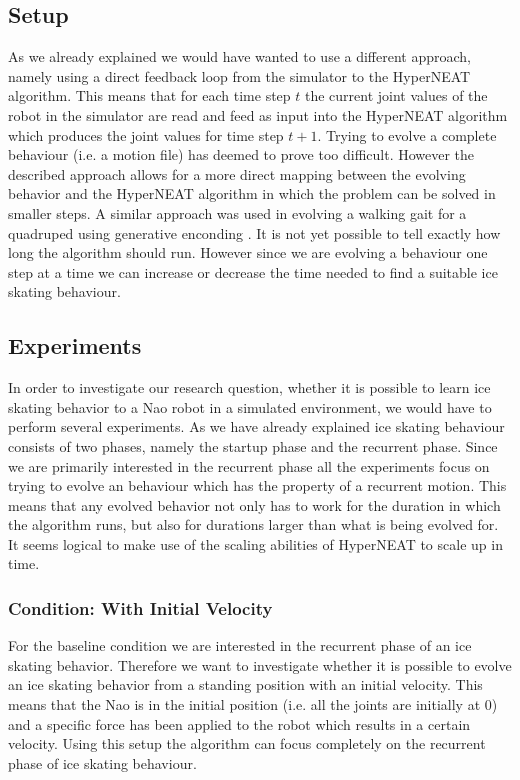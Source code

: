 \documentclass[a4paper,10pt]{article}
\begin{document}
\subsection{Setup}
\label{sec:setup}
As we already explained we would have wanted to use a different approach, namely using a direct feedback loop from the simulator to the HyperNEAT algorithm. This means that for each time step $t$ the current joint values of the robot in the simulator are read and feed as input into the HyperNEAT algorithm which produces the joint values for time step $t + 1$. Trying to evolve a complete behaviour (i.e. a motion file) has deemed to prove too difficult. However the described approach allows for a more direct mapping between the evolving behavior and the HyperNEAT algorithm in which the problem can be solved in smaller steps. A similar approach was used in evolving a walking gait for a quadruped using generative enconding \cite{EvolvingCoordinatedQuadrupedQaitsWithTheHyperNEATGenerativeEncoding}. It is not yet possible to tell exactly how long the algorithm should run. However since we are evolving a behaviour one step at a time we can increase or decrease the time needed to find a suitable ice skating behaviour.

\subsection{Experiments}
\label{sec:experiments}
In order to investigate our research question, whether it is possible to learn ice skating behavior to a Nao robot in a simulated environment, we would have to perform several experiments. As we have already explained ice skating behaviour consists of two phases, namely the startup phase and the recurrent phase. Since we are primarily interested in the recurrent phase all the experiments focus on trying to evolve an behaviour which has the property of a recurrent motion. This means that any evolved behavior not only has to work for the duration in which the algorithm runs, but also for durations larger than what is being evolved for. It seems logical to make use of the scaling abilities of HyperNEAT to scale up in time. 

\subsubsection{Condition: With Initial Velocity}
For the baseline condition we are interested in the recurrent phase of an ice skating behavior. Therefore we want to investigate whether it is possible to evolve an ice skating behavior from a standing position with an initial velocity. This means that the Nao is in the initial position (i.e. all the joints are initially at 0) and a specific force has been applied to the robot which results in a certain velocity. Using this setup the algorithm can focus completely on the recurrent phase of ice skating behaviour.
\end{document}
